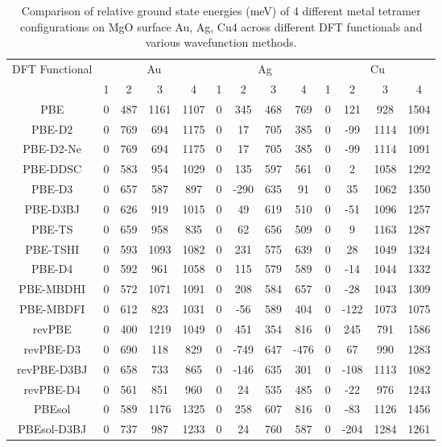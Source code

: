 \begin{table}[ht]
\centering
\caption{Comparison of relative ground state energies (meV) of 4 different metal tetramer configurations on MgO surface Au, Ag, Cu4 across different DFT functionals and various wavefunction methods.}
\begin{tabular}{ccccccccccccc}
\hline\hline
DFT Functional & \multicolumn{4}{c}{Au} & \multicolumn{4}{c}{Ag} & \multicolumn{4}{c}{Cu} \\ 
\cline{2-13}
 & 1 & 2 & 3 & 4 & 1 & 2 & 3 & 4 & 1 & 2 & 3 & 4 \\ \hline
PBE & 0 & 487 & 1161 & 1107 & 0 & 345 & 468 & 769 & 0 & 121 & 928 & 1504 \\ 
PBE-D2 & 0 & 769 & 694 & 1175 & 0 & 17 & 705 & 385 & 0 & -99 & 1114 & 1091 \\ 
PBE-D2-Ne & 0 & 769 & 694 & 1175 & 0 & 17 & 705 & 385 & 0 & -99 & 1114 & 1091 \\ 
PBE-DDSC & 0 & 583 & 954 & 1029 & 0 & 135 & 597 & 561 & 0 & 2 & 1058 & 1292 \\ 
PBE-D3 & 0 & 657 & 587 & 897 & 0 & -290 & 635 & 91 & 0 & 35 & 1062 & 1350 \\ 
PBE-D3BJ & 0 & 626 & 919 & 1015 & 0 & 49 & 619 & 510 & 0 & -51 & 1096 & 1257 \\ 
PBE-TS & 0 & 659 & 958 & 835 & 0 & 62 & 656 & 509 & 0 & 9 & 1163 & 1287 \\ 
PBE-TSHI & 0 & 593 & 1093 & 1082 & 0 & 231 & 575 & 639 & 0 & 28 & 1049 & 1324 \\ 
PBE-D4 & 0 & 592 & 961 & 1058 & 0 & 115 & 579 & 589 & 0 & -14 & 1044 & 1332 \\ 
PBE-MBDHI & 0 & 572 & 1071 & 1091 & 0 & 208 & 584 & 657 & 0 & -28 & 1043 & 1309 \\ 
PBE-MBDFI & 0 & 612 & 823 & 1031 & 0 & -56 & 589 & 404 & 0 & -122 & 1073 & 1075 \\ 
revPBE & 0 & 400 & 1219 & 1049 & 0 & 451 & 354 & 816 & 0 & 245 & 791 & 1586 \\ 
revPBE-D3 & 0 & 690 & 118 & 829 & 0 & -749 & 647 & -476 & 0 & 67 & 990 & 1283 \\ 
revPBE-D3BJ & 0 & 658 & 733 & 865 & 0 & -146 & 635 & 301 & 0 & -108 & 1113 & 1082 \\ 
revPBE-D4 & 0 & 561 & 851 & 960 & 0 & 24 & 535 & 485 & 0 & -22 & 976 & 1243 \\ 
PBEsol & 0 & 589 & 1176 & 1325 & 0 & 258 & 607 & 816 & 0 & -83 & 1126 & 1456 \\ 
PBEsol-D3BJ & 0 & 737 & 987 & 1233 & 0 & 24 & 760 & 587 & 0 & -204 & 1284 & 1261 \\ 

\end{tabular}
\end{table}
